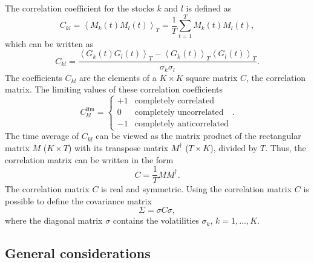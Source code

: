 The correlation coefficient for the stocks $k$ and $l$ is defined as
\cite{non_stationarity_fin_guhr}
\begin{equation}
    C_{kl} = \left\langle M_{k} \left( t \right) M_{l} \left( t \right)
    \right\rangle_{T} = \frac{1}{T} \sum_{t=1}^{T} M_{k} \left( t \right) M_{l}
    \left( t \right),
\end{equation}
which can be written as
\begin{equation}
    C_{kl} = \frac{\left\langle G_{k} \left( t \right) G_{l} \left( t \right)
    \right\rangle_{T} - \left\langle G_{k} \left( t \right) \right\rangle_{T}
    \left\langle G_{l} \left( t \right) \right\rangle_{T}}
    {\sigma_{k} \sigma_{l}}.
\end{equation}
The coefficients $C_{kl}$ are the elements of a $K \times K$ square matrix $C$,
the correlation matrix. The limiting values of these correlation coefficients
\begin{equation}
    C_{kl}^{\text{lim}} =
    \left\{
    \begin{array}{cc}
    +1 & \text{completely correlated}  \\
    0  & \text{completely uncorrelated}\\
    -1 & \text{completely anticorrelated}
    \end{array}
    \right. .
\end{equation}
The time average of $C_{kl}$ can be viewed as the matrix product of the
rectangular matrix $M$ ($K \times T$) with its transpose matrix $M^{\dagger}$
($T \times K$), divided by $T$. Thus, the correlation matrix can be written in
the form
\begin{equation}
    C = \frac{1}{T} M M^{\dagger}.
\end{equation}
The correlation matrix $C$ is real and symmetric. Using the correlation matrix
$C$ is possible to define the covariance matrix
\cite{credit_risk_guhr,portfolio_distributions_guhr,asset_correlations_guhr,stochastic_cov_guhr,exact_distributions_guhr}
\begin{equation}
    \Sigma = \sigma C \sigma ,
\end{equation}
where the diagonal matrix $\sigma$ contains the volatilities $\sigma_{k}$,
$k = 1, \ldots, K$.

\subsection{General considerations}\label{subsec:general_considerations}

